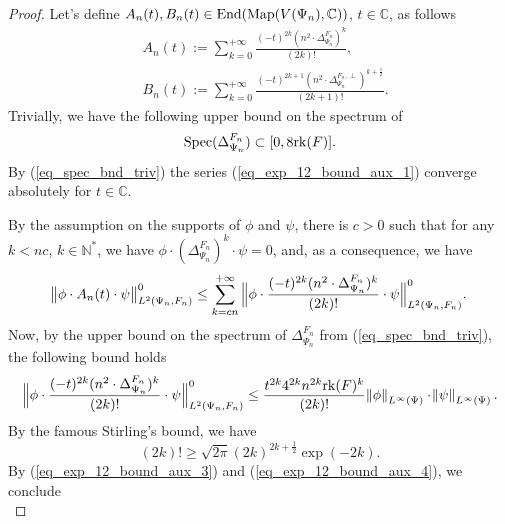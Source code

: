 \documentclass[12pt]{article}
\numberwithin{equation}{section}
\theoremstyle{theorem}
\theoremstyle{definition}
\theoremstyle{remark}
\newcommand{\comp}{\mathbb{C}}
\newcommand{\nat}{\mathbb{N}}
\newcommand{\spec}{{\rm{Spec}}}
\newcommand{\enmr}[1]{\text{End}{(#1)}}
\newcommand{\laplcomp}{\Delta}
\newcommand{\rk}[1]{{\rm{rk}} ( #1 )}
\begin{document}
	\begin{proof}
		Let's define $A_n(t), B_n(t) \in \enmr{{\rm{Map}}(V(\Psi_n), \comp)}$, $t \in \comp$, as follows
		\begin{equation}\label{eq_exp_12_bound_aux_1}
		\begin{aligned}			
			& A_n(t) :=
			\sum_{k = 0}^{+\infty}
			\frac{(-t)^{2k} (n^2 \cdot\laplcomp_{\Psi_n}^{F_n})^{k} }{(2k)!},
			\\
			& B_n(t) := \sum_{k = 0}^{+\infty}
			\frac{(-t)^{2k+1} (n^2  \cdot\laplcomp_{\Psi_n}^{F_n, \perp})^{k + \frac{1}{2}} }{(2k + 1)!}.
		\end{aligned}
		\end{equation}
		Trivially, we have the following upper bound on the spectrum of 
		\begin{equation}\label{eq_spec_bnd_triv}
			\spec (\laplcomp_{\Psi_n}^{F_n}) \subset [0, 8 \rk{F}].
		\end{equation}
		By (\ref{eq_spec_bnd_triv}) the series (\ref{eq_exp_12_bound_aux_1}) converge absolutely for $t \in \comp$.
		\par 
		By the assumption on the supports of $\phi$ and $\psi$, there is $c > 0$ such that for any $k < nc$, $k \in \nat^*$, we have $\phi \cdot (\laplcomp_{\Psi_n}^{F_n})^k \cdot \psi = 0$, and, as a consequence, we have
		\begin{equation}\label{eq_exp_12_bound_aux_2}
			\norm{\phi \cdot A_n(t) \cdot \psi}_{L^2(\Psi_n, F_n)}^{0}
			\leq
			\sum_{k = cn}^{+ \infty}
			\Big \|
				\phi \cdot \frac{(-t)^{2k} (n^2 \cdot\laplcomp_{\Psi_n}^{F_n})^{k} }{(2k)!} \cdot \psi
			\Big \|_{L^2(\Psi_n, F_n)}^{0}.
		\end{equation}
		Now, by the upper bound on the spectrum of $\laplcomp_{\Psi_n}^{F_n}$ from (\ref{eq_spec_bnd_triv}), the following bound holds
		\begin{equation}\label{eq_exp_12_bound_aux_3}
			\Big \|
				\phi \cdot \frac{(-t)^{2k} (n^2 \cdot\laplcomp_{\Psi_n}^{F_n})^{k} }{(2k)!} \cdot \psi
			\Big \|_{L^2(\Psi_n, F_n)}^{0}
			\leq
			\frac{t^{2k} 4^{2k} n^{2k} \rk{F}^k}{(2k)!}
			\norm{\phi}_{L^{\infty}(\Psi)} \cdot \norm{\psi}_{L^{\infty}(\Psi)}.
		\end{equation}
		By the famous Stirling's bound, we have
		\begin{equation}\label{eq_exp_12_bound_aux_4}
			(2k)! \geq \sqrt{2 \pi} (2k)^{2k + \frac{1}{2}} \exp(- 2k).
		\end{equation}
		By (\ref{eq_exp_12_bound_aux_3}) and (\ref{eq_exp_12_bound_aux_4}), we conclude
		\begin{equation}\label{eq_exp_12_bound_aux_5}

\end{equation}
\end{proof}
\end{document}
